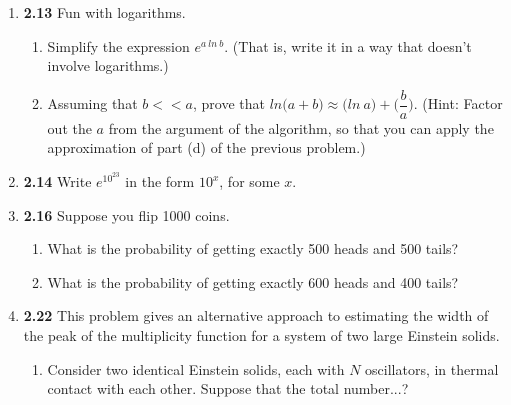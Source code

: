 \documentclass[fleqn]{article}
\begin{document}
\begin{enumerate}
\begin{enumerate}

    \end{enumerate}

    \item \textbf{2.13}  Fun with logarithms.
    \begin{enumerate}
      \item Simplify the expression $e^{a ~ ln ~ b}$. (That is, write it in a way that doesn't involve logarithms.)


      \item Assuming that $b << a$, prove that $ln \bigg( a+b \bigg) \approx \bigg( ln ~ a\bigg)+\bigg( \dfrac{b}{a}\bigg)$.
      (Hint: Factor out the $a$ from the argument of the algorithm, so that you can apply the approximation of part (d)
      of the previous problem.)


    \end{enumerate}

    \item \textbf{2.14} Write $e^{10^{23}}$ in the form  $10^x$, for some $x$.


    \item \textbf{2.16} Suppose you flip 1000 coins.
    \begin{enumerate}
      \item What is the probability of getting exactly 500 heads and 500 tails?


      \item What is the probability of getting exactly 600 heads and 400 tails?


    \end{enumerate}

    \item \textbf{2.22} This problem gives an alternative approach to estimating the width of the peak of the multiplicity 
    function for a system of two large Einstein solids.
    \begin{enumerate}
      \item Consider two identical Einstein solids, each with $N$ oscillators, in thermal contact with each other. Suppose
      that the total number...?


\end{enumerate}
\end{enumerate}
\end{document}
